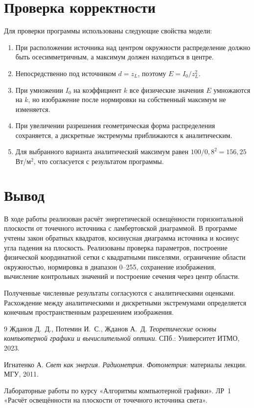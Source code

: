 \documentclass[a4paper,12pt]{article}
\begin{document}
\section{Проверка корректности}

Для проверки программы использованы следующие свойства модели:
\begin{enumerate}
  \item При расположении источника над центром окружности распределение должно
        быть осесимметричным, а максимум должен находиться в центре.
  \item Непосредственно под источником $d=z_L$, поэтому
        $E=I_0/z_L^2$.
  \item При умножении $I_0$ на коэффициент $k$ все физические значения $E$
        умножаются на $k$, но изображение после нормировки на собственный
        максимум не изменяется.
  \item При увеличении разрешения геометрическая форма распределения
        сохраняется, а дискретные экстремумы приближаются к аналитическим.
  \item Для выбранного варианта аналитический максимум равен
        $100/0{,}8^2=156{,}25$ Вт/м$^2$, что согласуется с результатом программы.
\end{enumerate}

\section{Вывод}

В ходе работы реализован расчёт энергетической освещённости горизонтальной
плоскости от точечного источника с ламбертовской диаграммой. В программе
учтены закон обратных квадратов, косинусная диаграмма источника и косинус
угла падения на плоскость. Реализованы проверка параметров, построение
физической координатной сетки с квадратными пикселями, ограничение области
окружностью, нормировка в диапазон 0--255, сохранение изображения, вычисление
контрольных значений и построение сечения через центр области.

Полученные численные результаты согласуются с аналитическими оценками.
Расхождение между аналитическими и дискретными экстремумами определяется
конечным пространственным разрешением изображения.

\begin{thebibliography}{9}
  Жданов Д.~Д., Потемин И.~С., Жданов А.~Д.
  \textit{Теоретические основы компьютерной графики и вычислительной оптики}.
  СПб.: Университет ИТМО, 2023.

  Игнатенко А.
  \textit{Свет как энергия. Радиометрия. Фотометрия}: материалы лекции.
  МГУ, 2011.

  Лабораторные работы по курсу «Алгоритмы компьютерной графики».
  ЛР~1 «Расчёт освещённости на плоскости от точечного источника света».
\end{thebibliography}
\end{document}

